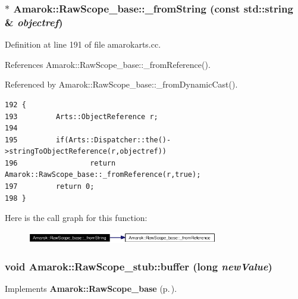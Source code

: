 \subsubsection{ $\ast$ Amarok::Raw\-Scope\_\-base::\_\-from\-String (const std::string \& {\em objectref})\hspace{0.3cm}{\tt  [static, inherited]}}\label{classAmarok_1_1RawScope__base_Amarok_1_1RawScope__stube1}




Definition at line 191 of file amarokarts.cc.

References Amarok::Raw\-Scope\_\-base::\_\-from\-Reference().

Referenced by Amarok::Raw\-Scope\_\-base::\_\-from\-Dynamic\-Cast().



\footnotesize\begin{verbatim}192 {
193         Arts::ObjectReference r;
194 
195         if(Arts::Dispatcher::the()->stringToObjectReference(r,objectref))
196                 return Amarok::RawScope_base::_fromReference(r,true);
197         return 0;
198 }
\end{verbatim}\normalsize 


Here is the call graph for this function:\begin{figure}[H]
\begin{center}
\leavevmode
\includegraphics[width=236pt]{classAmarok_1_1RawScope__base_Amarok_1_1RawScope__stube1_cgraph}
\end{center}
\end{figure}
\subsubsection{\setlength{\rightskip}{0pt plus 5cm}void Amarok::Raw\-Scope\_\-stub::buffer (long {\em new\-Value})\hspace{0.3cm}{\tt  [virtual]}}\label{classAmarok_1_1RawScope__stub_Amarok_1_1RawScope__stuba2}




Implements {\bf Amarok::Raw\-Scope\_\-base} {\rm (p.\,\pageref{classAmarok_1_1RawScope__base_Amarok_1_1RawScope__skela10})}.

